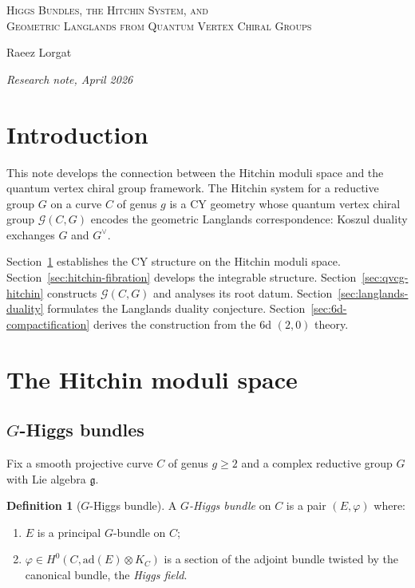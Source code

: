 \documentclass[11pt]{article}
\theoremstyle{definition}
\newtheorem{definition}[theorem]{Definition}
\theoremstyle{remark}
\newcommand{\frakg}{\mathfrak{g}}
\begin{document}
\begin{center}
{\LARGE\scshape Higgs Bundles, the Hitchin System, and\\
Geometric Langlands from Quantum Vertex Chiral Groups}

\bigskip

{\large Raeez Lorgat}

\medskip

{\itshape Research note, April 2026}
\end{center}

\bigskip

\tableofcontents

\bigskip

\section*{Introduction}

This note develops the connection between the Hitchin moduli space and the quantum vertex chiral group framework. The Hitchin system for a reductive group $G$ on a curve $C$ of genus $g$ is a CY geometry whose quantum vertex chiral group $\mathcal{G}(C, G)$ encodes the geometric Langlands correspondence: Koszul duality exchanges $G$ and $G^\vee$.

Section~\ref{sec:hitchin-moduli} establishes the CY structure on the Hitchin moduli space. Section~\ref{sec:hitchin-fibration} develops the integrable structure. Section~\ref{sec:qvcg-hitchin} constructs $\mathcal{G}(C, G)$ and analyses its root datum. Section~\ref{sec:langlands-duality} formulates the Langlands duality conjecture. Section~\ref{sec:6d-compactification} derives the construction from the 6d $(2,0)$ theory.


\section{The Hitchin moduli space}
\label{sec:hitchin-moduli}

\subsection{$G$-Higgs bundles}

Fix a smooth projective curve $C$ of genus $g \geq 2$ and a complex reductive group $G$ with Lie algebra $\frakg$.

\begin{definition}[$G$-Higgs bundle]
\label{def:higgs-bundle}
A \emph{$G$-Higgs bundle} on $C$ is a pair $(E, \varphi)$ where:
\begin{enumerate}[label=(\roman*)]
 \item $E$ is a principal $G$-bundle on $C$;
 \item $\varphi \in H^0(C, \mathrm{ad}(E) \otimes K_C)$ is a section of the adjoint bundle twisted by the canonical bundle, the \emph{Higgs field}.
\end{enumerate}
\end{definition}
\end{document}
